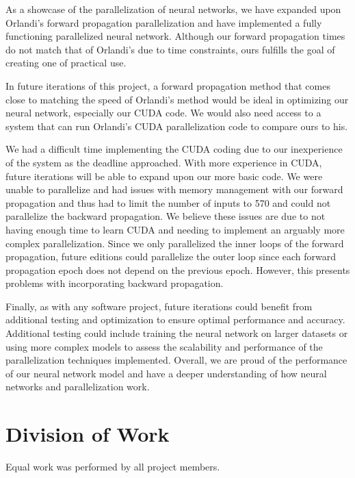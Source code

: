 \documentclass[11pt]{article}
\begin{document}
As a showcase of the parallelization of neural networks, we have expanded upon Orlandi's forward propagation parallelization and have implemented a fully functioning parallelized neural network. Although our forward propagation times do not match that of Orlandi's due to time constraints, ours fulfills the goal of creating one of practical use. 

\bigskip

In future iterations of this project, a forward propagation method that comes close to matching the speed of Orlandi's method would be ideal in optimizing our neural network, especially our CUDA code. We would also need access to a system that can run Orlandi's CUDA parallelization code to compare ours to his.

\bigskip

We had a difficult time implementing the CUDA coding due to our inexperience of the system as the deadline approached. With more experience in CUDA, future iterations will be able to expand upon our more basic code. We were unable to parallelize and had issues with memory management with our forward propagation and thus had to limit the number of inputs to 570 and could not parallelize the backward propagation. We believe these issues are due to not having enough time to learn CUDA and needing to implement an arguably more complex parallelization. Since we only parallelized the inner loops of the forward propagation, future editions could parallelize the outer loop since each forward propagation epoch does not depend on the previous epoch. However, this presents problems with incorporating backward propagation.

\bigskip

Finally, as with any software project, future iterations could benefit from additional testing and optimization to ensure optimal performance and accuracy. Additional testing could include training the neural network on larger datasets or using more complex models to assess the scalability and performance of the parallelization techniques implemented. Overall, we are proud of the performance of our neural network model and have a deeper understanding of how neural networks and parallelization work.


\section{Division of Work}
Equal work was performed by all project members.

 

\end{document}
